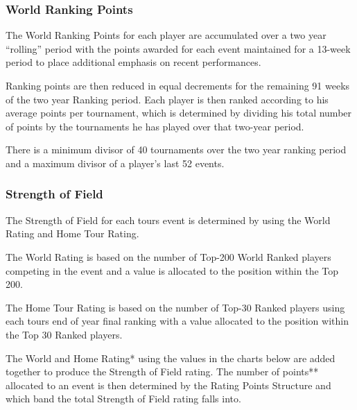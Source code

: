 \documentclass{article}
\begin{document}
\subsubsection{World Ranking Points}

The World Ranking Points for each player are accumulated over a two year “rolling” period with the points awarded for each event maintained for a 13-week period to place additional emphasis on recent performances.

Ranking points are then reduced in equal decrements for the remaining 91 weeks of the two year Ranking period. Each player is then ranked according to his average points per tournament, which is determined by dividing his total number of points by the tournaments he has played over that two-year period.

There is a minimum divisor of 40 tournaments over the two year ranking period and a maximum divisor of a player’s last 52 events.

\subsubsection{Strength of Field}

The Strength of Field for each tours event is determined by using the World Rating and Home Tour Rating.

The World Rating is based on the number of Top-200 World Ranked players competing in the event and a value is allocated to the position within the Top 200.

The Home Tour Rating is based on the number of Top-30 Ranked players using each tours end of year final ranking with a value allocated to the position within the Top 30 Ranked players.

The World and Home Rating* using the values in the charts below are added together to produce the Strength of Field rating. The number of points** allocated to an event is then determined by the Rating Points Structure and which band the total Strength of Field rating falls into.
\end{document}
